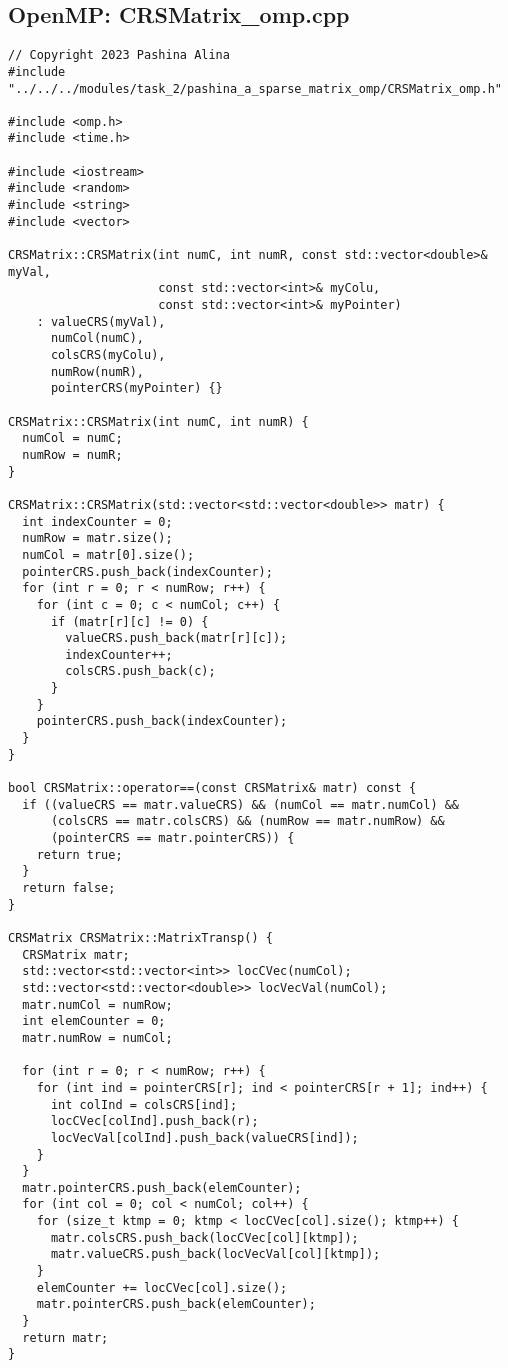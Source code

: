 \documentclass[14pt, russian]{extarticle}
\begin{document}
	\subsection{OpenMP: CRSMatrix\_omp.cpp}
	\begin{lstlisting}
// Copyright 2023 Pashina Alina
#include "../../../modules/task_2/pashina_a_sparse_matrix_omp/CRSMatrix_omp.h"

#include <omp.h>
#include <time.h>

#include <iostream>
#include <random>
#include <string>
#include <vector>

CRSMatrix::CRSMatrix(int numC, int numR, const std::vector<double>& myVal,
                     const std::vector<int>& myColu,
                     const std::vector<int>& myPointer)
    : valueCRS(myVal),
      numCol(numC),
      colsCRS(myColu),
      numRow(numR),
      pointerCRS(myPointer) {}

CRSMatrix::CRSMatrix(int numC, int numR) {
  numCol = numC;
  numRow = numR;
}

CRSMatrix::CRSMatrix(std::vector<std::vector<double>> matr) {
  int indexCounter = 0;
  numRow = matr.size();
  numCol = matr[0].size();
  pointerCRS.push_back(indexCounter);
  for (int r = 0; r < numRow; r++) {
    for (int c = 0; c < numCol; c++) {
      if (matr[r][c] != 0) {
        valueCRS.push_back(matr[r][c]);
        indexCounter++;
        colsCRS.push_back(c);
      }
    }
    pointerCRS.push_back(indexCounter);
  }
}

bool CRSMatrix::operator==(const CRSMatrix& matr) const {
  if ((valueCRS == matr.valueCRS) && (numCol == matr.numCol) &&
      (colsCRS == matr.colsCRS) && (numRow == matr.numRow) &&
      (pointerCRS == matr.pointerCRS)) {
    return true;
  }
  return false;
}

CRSMatrix CRSMatrix::MatrixTransp() {
  CRSMatrix matr;
  std::vector<std::vector<int>> locCVec(numCol);
  std::vector<std::vector<double>> locVecVal(numCol);
  matr.numCol = numRow;
  int elemCounter = 0;
  matr.numRow = numCol;

  for (int r = 0; r < numRow; r++) {
    for (int ind = pointerCRS[r]; ind < pointerCRS[r + 1]; ind++) {
      int colInd = colsCRS[ind];
      locCVec[colInd].push_back(r);
      locVecVal[colInd].push_back(valueCRS[ind]);
    }
  }
  matr.pointerCRS.push_back(elemCounter);
  for (int col = 0; col < numCol; col++) {
    for (size_t ktmp = 0; ktmp < locCVec[col].size(); ktmp++) {
      matr.colsCRS.push_back(locCVec[col][ktmp]);
      matr.valueCRS.push_back(locVecVal[col][ktmp]);
    }
    elemCounter += locCVec[col].size();
    matr.pointerCRS.push_back(elemCounter);
  }
  return matr;
}


\end{lstlisting}
\end{document}
